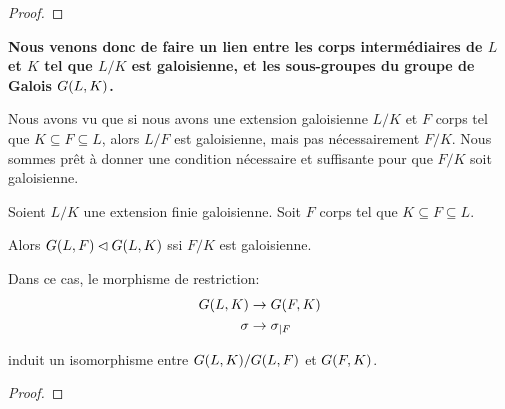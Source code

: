 \ifdefined\outputproof
\begin{proof}

\end{proof}
\fi

\textbf{Nous venons donc de faire un lien entre les corps intermédiaires de $L$ et
$K$ tel que $L/K$ est galoisienne, et les sous-groupes du groupe de Galois
$G(L, K)$.}

Nous avons vu que si nous avons une extension galoisienne $L/K$ et $F$ corps tel
que $K \subseteq F \subseteq L$, alors $L/F$ est galoisienne, mais pas
nécessairement $F/K$.
Nous sommes prêt à donner une condition nécessaire et suffisante pour que $F/K$
soit galoisienne.

\begin{proposition}
	Soient $L/K$ une extension finie galoisienne. Soit $F$ corps tel que $K
	\subseteq F \subseteq L$.

	Alors $G(L, F) \lhd G(L, K)$ ssi $F/K$ est
	galoisienne.

	Dans ce cas, le morphisme de restriction:
	\begin{align*}
		G(L, K) &\rightarrow G(F, K) \\
		\sigma &\rightarrow \sigma_{|F}
	\end{align*}

	induit un isomorphisme entre $G(L, K)/G(L, F)$ et
	$G(F, K)$.
\end{proposition}

\ifdefined\outputproof
\begin{proof}

\end{proof}
\fi
